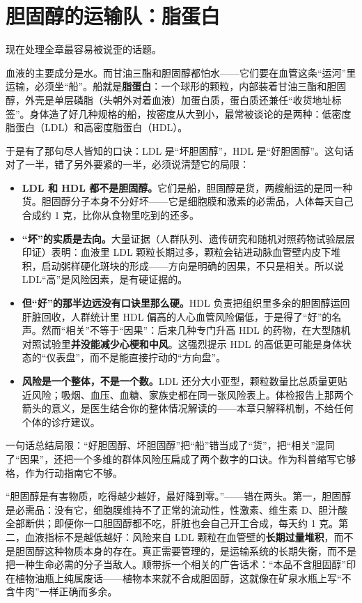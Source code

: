 \section{胆固醇的运输队：脂蛋白}

现在处理全章最容易被说歪的话题。

血液的主要成分是水。而甘油三酯和胆固醇都怕水——它们要在血管这条“运河”里运输，必须坐“船”。船就是\textbf{脂蛋白}：一个球形的颗粒，内部装着甘油三酯和胆固醇，外壳是单层磷脂（头朝外对着血液）加蛋白质，蛋白质还兼任“收货地址标签”。身体造了好几种规格的船，按密度从大到小，最常被谈论的是两种：低密度脂蛋白（LDL）和高密度脂蛋白（HDL）。

于是有了那句尽人皆知的口诀：LDL 是“坏胆固醇”，HDL 是“好胆固醇”。这句话对了一半，错了另外要紧的一半，必须说清楚它的局限：

\begin{itemize}[itemsep=2pt]
\item \textbf{LDL 和 HDL 都不是胆固醇。}它们是船，胆固醇是货，两艘船运的是同一种货。胆固醇分子本身不分好坏——它是细胞膜和激素的必需品，人体每天自己合成约 1 克，比你从食物里吃到的还多。
\item \textbf{“坏”的实质是去向。}大量证据（人群队列、遗传研究和随机对照药物试验层层印证）表明：血液里 LDL 颗粒长期过多，颗粒会钻进动脉血管壁内皮下堆积，启动粥样硬化斑块的形成——方向是明确的因果，不只是相关。所以说 LDL“高”是风险因素，是有硬证据的。
\item \textbf{但“好”的那半边远没有口诀里那么硬。}HDL 负责把组织里多余的胆固醇运回肝脏回收，人群统计里 HDL 偏高的人心血管风险偏低，于是得了“好”的名声。然而“相关”不等于“因果”：后来几种专门升高 HDL 的药物，在大型随机对照试验里\textbf{并没能减少心梗和中风}。这强烈提示 HDL 的高低更可能是身体状态的“仪表盘”，而不是能直接拧动的“方向盘”。
\item \textbf{风险是一个整体，不是一个数。}LDL 还分大小亚型，颗粒数量比总质量更贴近风险；吸烟、血压、血糖、家族史都在同一张风险表上。体检报告上那两个箭头的意义，是医生结合你的整体情况解读的——本章只解释机制，不给任何个体的诊疗建议。
\end{itemize}

一句话总结局限：“好胆固醇、坏胆固醇”把“船”错当成了“货”，把“相关”混同了“因果”，还把一个多维的群体风险压扁成了两个数字的口诀。作为科普缩写它够格，作为行动指南它不够。

\begin{wuqu}
“胆固醇是有害物质，吃得越少越好，最好降到零。”——错在两头。第一，胆固醇是必需品：没有它，细胞膜维持不了正常的流动性，性激素、维生素 D、胆汁酸全部断供；即便你一口胆固醇都不吃，肝脏也会自己开工合成，每天约 1 克。第二，血液指标不是越低越好：风险来自 LDL 颗粒在血管壁的\textbf{长期过量堆积}，而不是胆固醇这种物质本身的存在。真正需要管理的，是运输系统的长期失衡，而不是把一种生命必需的分子当敌人。顺带拆一个相关的广告话术：“本品不含胆固醇”印在植物油瓶上纯属废话——植物本来就不合成胆固醇，这就像在矿泉水瓶上写“不含牛肉”一样正确而多余。
\end{wuqu}

